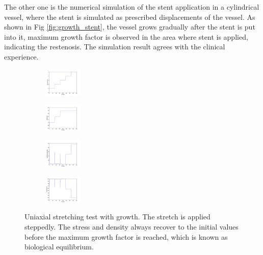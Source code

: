 \documentclass[12pt]{article}
\begin{document}
The other one is the numerical simulation of the stent application in a cylindrical vessel, where the stent is simulated as prescribed displacements of the vessel. As shown in Fig \ref{fig:growth_stent}, the vessel grows gradually after the stent is put into it, maximum growth factor is observed in the area where stent is applied, indicating the restenosis. The simulation result agrees with the clinical experience.

\begin{figure}[H]
	\centering
	\begin{subfigure}
		\centering
		\includegraphics[trim = {1.5cm, 1.3cm, 1.5cm, 1.5cm}, clip, width = 0.2\textwidth]{./figs/stretch1.jpg}
	\end{subfigure}
	\begin{subfigure}
		\centering
		\includegraphics[trim = {1.5cm, 1.3cm, 1.5cm, 1.5cm}, clip, width = 0.2\textwidth]{./figs/stretch2.jpg}
	\end{subfigure}
	\begin{subfigure}
		\centering
		\includegraphics[trim = {1.5cm, 1.3cm, 1.5cm, 1.5cm}, clip, width = 0.2\textwidth]{./figs/stretch3.jpg}
	\end{subfigure}
	\begin{subfigure}
		\centering
		\includegraphics[trim = {1.5cm, 1.3cm, 1.5cm, 1.5cm}, clip, width = 0.2\textwidth]{./figs/stretch4.jpg}
	\end{subfigure}
	\caption{Uniaxial stretching test with growth. The stretch is applied steppedly. The stress and density always recover to the initial values before the maximum growth factor is reached, which is known as biological equilibrium.}
	\label{fig:growth_results}
\end{figure}
\end{document}
